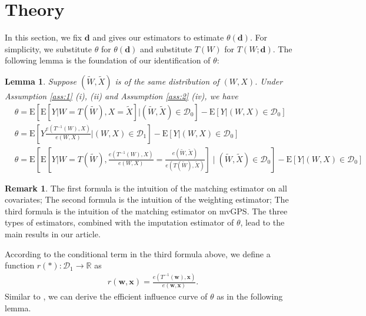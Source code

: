 \documentclass[11pt]{article}
\def\E{{\mathrm E}}
\numberwithin{equation}{section}
\newtheorem{lemma}{Lemma}[section]
\theoremstyle{definition}
\newtheorem{remark}{Remark}[section]
\begin{document}
\section{Theory}\label{sec:theory}
In this section, we fix $\mathbf{d}$ and gives our estimators to estimate $\theta(\mathbf{d})$. For simplicity, we substitute $\theta$ for $\theta(\mathbf{d})$ and substitute $T(W)$ for $T(W;\mathbf{d})$. The following lemma is the foundation of our identification of $\theta$:
\begin{lemma} \label{lem:identification}
Suppose $(\tilde{W},\tilde{X})$ is of the same distribution of $(W,X)$. Under Assumption \ref{ass:1} (i), (ii) and Assumption \ref{ass:2} (iv), we have
\begin{align}
&\theta=\E\left[\E\left[Y|W=T(\tilde{W}), X=\tilde{X}\right]|(\tilde{W},\tilde{X}) \in \mathcal{D}_0\right]-\E\left[Y|(W,X)\in \mathcal{D}_0\right]\label{iden_1}\\
&\theta=\E\left[Y\frac{e(T^{-1}(W),X)}{e(W,X)}|(W,X) \in \mathcal{D}_1\right]-\E\left[Y|(W,X) \in \mathcal{D}_0\right]\label{iden_2}\\
&\theta=\E\left[\E\left[Y|W=T(\tilde{W}),\frac{e(T^{-1}(W),X)}{e(W,X)}=\frac{e(\tilde{W},\tilde{X})}{e(T(\tilde{W}),\tilde{X})}\right]\mid (\tilde{W},\tilde{X})\in\mathcal{D}_0\right]-\E\left[Y|(W,X) \in \mathcal{D}_0\right]\label{iden_3}
\end{align}
\end{lemma}
\begin{remark}
    The first formula is the intuition of the matching estimator on all covariates; The second formula is the intuition of the weighting estimator; The third formula is the intuition of the matching estimator on mvGPS. The three types of estimators, combined with the imputation estimator of $\theta$, lead to the main results in our article.
\end{remark}
According to the conditional term in the third formula above, we define a function $r(*): \mathcal{D}_1\to \mathbb{R}$ as
\begin{align}
 r(\mathbf{w},\mathbf{x})=\frac{e(T^{-1}(\mathbf{w}),\mathbf{x})}{e(\mathbf{w},\mathbf{x})}.
\end{align}
Similar to \cite{munoz2012population}, we can derive the efficient influence curve of $\theta$ as in the following lemma.
\end{document}
